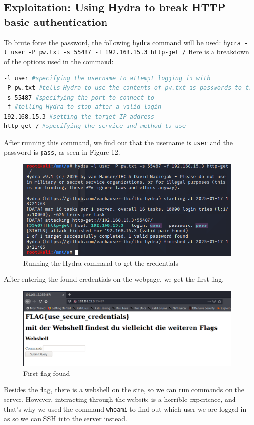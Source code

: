 \documentclass[a4paper]{article}
\newcommand{\abc}{\hfill \break}
\begin{document}
\subsection{Exploitation: Using Hydra to break HTTP basic authentication}
To brute force the password, the following \texttt{hydra} command will be used: \texttt{hydra -l user -P pw.txt -s 55487 -f 192.168.15.3 http-get /}
Here is a breakdown of the options used in the command:\cite{hydra-http-basic-auth}
\begin{lstlisting}[language=bash]
-l user #specifying the username to attempt logging in with
-P pw.txt #tells Hydra to use the contents of pw.txt as passwords to try
-s 55487 #specifying the port to connect to
-f #telling Hydra to stop after a valid login
192.168.15.3 #setting the target IP address
http-get / #specifying the service and method to use
\end{lstlisting}
After running this command, we find out that the username is \texttt{user} and the password is \texttt{pass}, as seen in Figure 12.
\begin{figure}[h]
	\includegraphics[scale=0.5]{images/hydra.png}
	\centering
	\caption{Running the Hydra command to get the credentials}
\end{figure}\abc
\newpage
After entering the found credentials on the webpage, we get the first flag.
\begin{figure}[h]
	\includegraphics[scale=0.3]{images/flag1.png}
	\centering
	\caption{First flag found}
\end{figure}\abc
Besides the flag, there is a webshell on the site, so we can run commands on the server. However, interacting through the website is a horrible experience, and that's why we used the command \texttt{whoami} to find out which user we are logged in as so we can SSH into the server instead.
\end{document}

